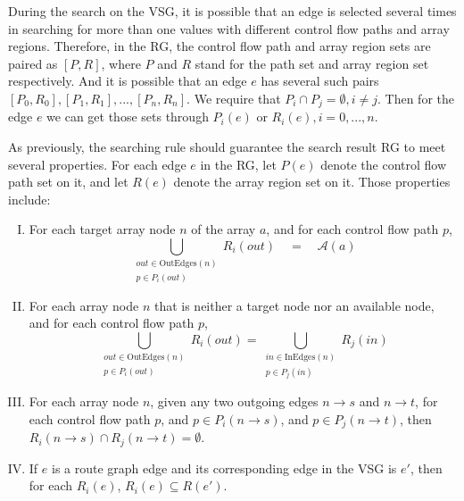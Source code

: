 \documentclass[12pt]{gatech-thesis}
\begin{document}
During the search on the VSG, it is possible that an edge is selected several times in searching for more than one values with different control flow paths and array regions. 
Therefore, in the RG, the control flow path and array region sets are paired as $[P,R]$, where $P$ and $R$ stand for the path set and array region set respectively.
 And it is possible that an edge $e$ has several such pairs $[P_0,R_0],[P_1,R_1],...,[P_n,R_n]$.
We require that $P_i \cap P_j = \emptyset, i\ne j$.
Then for the edge $e$ we can get those sets through $P_i(e)$ or $R_i(e), i = 0,...,n$.

As previously, the searching rule should guarantee the search result RG to meet several properties. 
For each edge $e$ in the RG, let $P(e)$ denote the control flow path set on it, and let $R(e)$ denote the array region set on it.
Those properties include:

\begin{enumerate}[I)]

\item For each target array node $n$ of the array $a$, and for each control flow path $p$,
	$$\bigcup_{\substack{\mathit{out} \in \text{OutEdges}(n)  \\  p \in P_i(out)}}R_i(\mathit{out}) \quad = \quad \mathcal{A}(a) $$ 
	\label{rg-property-1}

\item For each array node $n$ that is neither a target node nor an available node, and for each control flow path $p$,
	$$\bigcup_{\substack{\mathit{out} \in \text{OutEdges} (n) \\ p \in P_i(out)}} R_i(out) = \bigcup_{\substack{\mathit{in} \in \text{InEdges} (n)  \\  p \in P_j(in) }}R_j( \mathit{in} )$$ 

\item For each array node $n$, given any two outgoing edges $n\to s$ and $n\to t$, for each control flow path $p$, and $p \in P_i(n \to s)$, and $p \in P_j(n \to t)$, then $R_i(n\to s) \cap R_j(n\to t) = \emptyset$.

\item If $e$ is a route graph edge and its corresponding edge in the VSG is $e'$, then for each $R_i(e)$,
$R_i(e) \subseteq R(e')$.
	\label{rg-property-4}


\end{enumerate}
\end{document}
